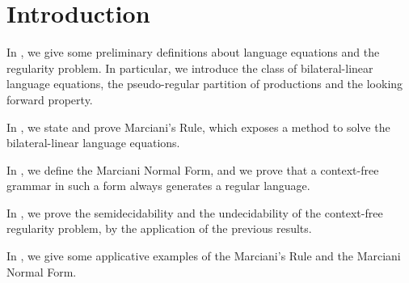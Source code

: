 \section{Introduction}
\label{sec:introduction}

In , we give some preliminary definitions about language
equations and the regularity problem.
In particular, we introduce the class of bilateral-linear language equations,
the pseudo-regular partition of productions and the looking forward property.

In , we state and prove Marciani's Rule, which exposes
a method to solve the bilateral-linear language equations.

In , we define the Marciani Normal Form, and we
prove that a context-free grammar in such a form always generates a regular
language.

In , we prove the semidecidability and the
undecidability of the context-free regularity problem, by the application of the 
previous results.

In , we give some applicative examples of the Marciani's Rule
and the Marciani Normal Form.
